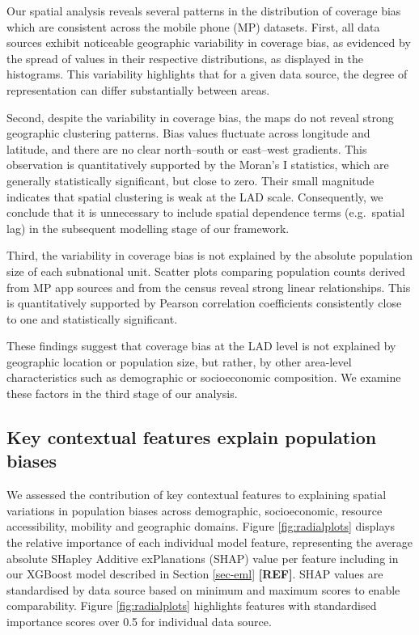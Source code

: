 \documentclass[]{rsos}%
\begin{document}
Our spatial analysis reveals several patterns in the distribution of
coverage bias which are consistent across the mobile phone (MP)
datasets. First, all data sources exhibit noticeable geographic
variability in coverage bias, as evidenced by the spread of values in
their respective distributions, as displayed in the histograms. This
variability highlights that for a given data source, the degree of
representation can differ substantially between areas.

Second, despite the variability in coverage bias, the maps do not reveal
strong geographic clustering patterns. Bias values fluctuate across
longitude and latitude, and there are no clear north--south or east--west
gradients. This observation is quantitatively supported by the Moran's I
statistics, which are generally statistically significant, but close to
zero. Their small magnitude indicates that spatial clustering is weak at
the LAD scale. Consequently, we conclude that it is unnecessary to
include spatial dependence terms (e.g.~spatial lag) in the subsequent
modelling stage of our framework.

Third, the variability in coverage bias is not explained by the absolute
population size of each subnational unit. Scatter plots comparing
population counts derived from MP app sources and from the census reveal
strong linear relationships. This is quantitatively supported by Pearson
correlation coefficients consistently close to one and statistically
significant.

These findings suggest that coverage bias at the LAD level is not
explained by geographic location or population size, but rather, by
other area-level characteristics such as demographic or socioeconomic
composition. We examine these factors in the third stage of our analysis.

\subsection{Key contextual features explain population biases}\label{key-contextual-features-explain-population-biases}

We assessed the contribution of key contextual features to explaining spatial variations in population biases across demographic, socioeconomic, resource accessibility, mobility and geographic domains. Figure \ref{fig:radialplots} displays the relative importance of each individual model feature, representing the average absolute SHapley Additive exPlanations (SHAP) value per feature including in our XGBoost model described in Section \ref{sec-eml} \textbf{{[}REF{]}}. SHAP values are standardised by data source based on minimum and maximum scores to enable comparability. Figure \ref{fig:radialplots} highlights features with standardised importance scores over 0.5 for individual data source.
\end{document}

